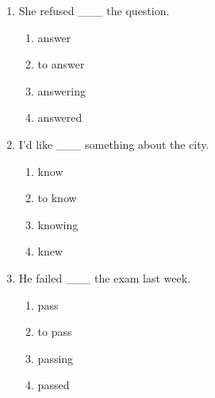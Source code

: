 \documentclass[11pt,a4paper]{ctexart}
\begin{document}
\begin{enumerate}[leftmargin=*,itemsep=4pt]
\begin{enumerate}[label=\Alph*.,leftmargin=2em,itemsep=1pt,topsep=2pt]
\item take
\item to take
\item taking
\item took
\end{enumerate}
\item She refused \_\_\_ the question.
\begin{enumerate}[label=\Alph*.,leftmargin=2em,itemsep=1pt,topsep=2pt]
\item answer
\item to answer
\item answering
\item answered
\end{enumerate}
\item I’d like \_\_\_ something about the city.
\begin{enumerate}[label=\Alph*.,leftmargin=2em,itemsep=1pt,topsep=2pt]
\item know
\item to know
\item knowing
\item knew
\end{enumerate}
\item He failed \_\_\_ the exam last week.
\begin{enumerate}[label=\Alph*.,leftmargin=2em,itemsep=1pt,topsep=2pt]
\item pass
\item to pass
\item passing
\item passed
\end{enumerate}
\end{enumerate}
\end{document}
